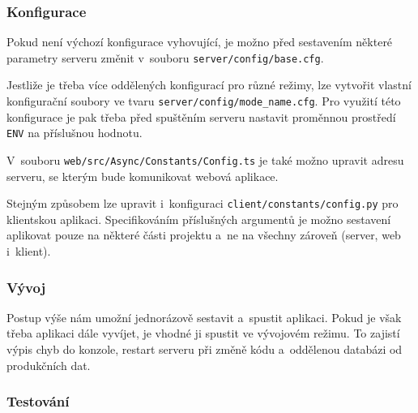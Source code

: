 \documentclass[a4paper,12pt]{article}
\def\code#1{\texttt{#1}}
\begin{document}
{{{{{{{{{{{\subsubsection{Konfigurace}

Pokud není výchozí konfigurace vyhovující, je možno před sestavením některé parametry serveru změnit v~souboru \code{server/config/base.cfg}.



\vspace{-10pt}

Jestliže je třeba více oddělených konfigurací pro různé režimy, lze vytvořit vlastní konfigurační soubory ve tvaru \code{server/config/mode\_name.cfg}. Pro využití této konfigurace je pak třeba před spuštěním serveru nastavit proměnnou prostředí \code{ENV} na příslušnou hodnotu.



V~souboru \code{web/src/Async/Constants/Config.ts} je také možno upravit adresu serveru, se kterým bude komunikovat webová aplikace.



Stejným způsobem lze upravit i~konfiguraci \code{client/constants/config.py} pro klientskou aplikaci. Specifikováním příslušných argumentů je možno sestavení aplikovat pouze na některé části projektu a~ne na všechny zároveň (server, web i~klient).



\vspace{-10pt}

\subsubsection{Vývoj}

Postup výše nám umožní jednorázově sestavit a~spustit aplikaci. Pokud je však třeba aplikaci dále vyvíjet, je vhodné ji spustit ve vývojovém režimu. To zajistí výpis chyb do konzole, restart serveru při změně kódu a~oddělenou databázi od produkčních dat.



\subsubsection{Testování}

}}}}}}}}}}}
\end{document}

